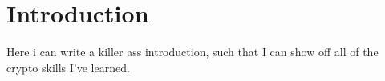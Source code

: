 \documentclass[../master.tex]{subfiles}
\begin{document}
    \section{Introduction}\label{sec:introduction}
    Here i can write a killer ass introduction, such that I can show off all of the crypto skills I've learned.
\end{document}
